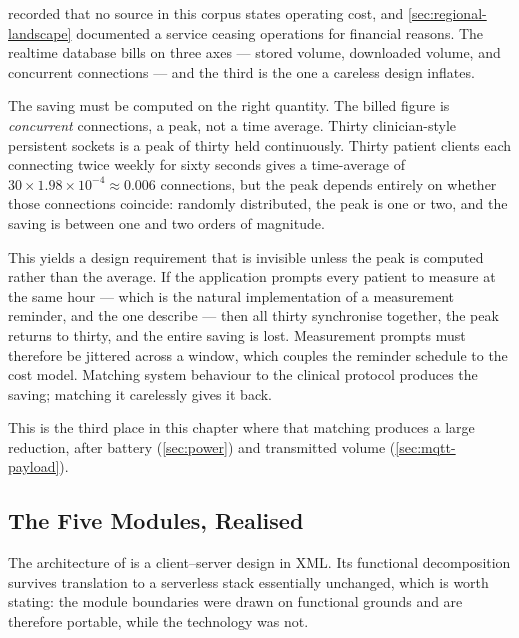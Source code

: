 \documentclass[12pt,a4paper,oneside]{report}
\begin{document}
 recorded that no source in this corpus states operating cost, and \cref{sec:regional-landscape} documented a service ceasing operations for financial reasons. The realtime database bills on three axes --- stored volume, downloaded volume, and concurrent connections --- and the third is the one a careless design inflates.

The saving must be computed on the right quantity. The billed figure is \emph{concurrent} connections, a peak, not a time average. Thirty clinician-style persistent sockets is a peak of thirty held continuously. Thirty patient clients each connecting twice weekly for sixty seconds gives a time-average of $30 \times 1.98\times10^{-4} \approx 0.006$ connections, but the peak depends entirely on whether those connections coincide: randomly distributed, the peak is one or two, and the saving is between one and two orders of magnitude.

This yields a design requirement that is invisible unless the peak is computed rather than the average. If the application prompts every patient to measure at the same hour --- which is the natural implementation of a measurement reminder, and the one \textcite{yazdani2018} describe --- then all thirty synchronise together, the peak returns to thirty, and the entire saving is lost. Measurement prompts must therefore be jittered across a window, which couples the reminder schedule to the cost model. Matching system behaviour to the clinical protocol produces the saving; matching it carelessly gives it back.

This is the third place in this chapter where that matching produces a large reduction, after battery (\cref{sec:power}) and transmitted volume (\cref{sec:mqtt-payload}).

\subsection{The Five Modules, Realised}\label{sec:modules}

The architecture of \textcite{yazdani2018} is a client--server design in XML. Its functional decomposition survives translation to a serverless stack essentially unchanged, which is worth stating: the module boundaries were drawn on functional grounds and are therefore portable, while the technology was not.
\end{document}
